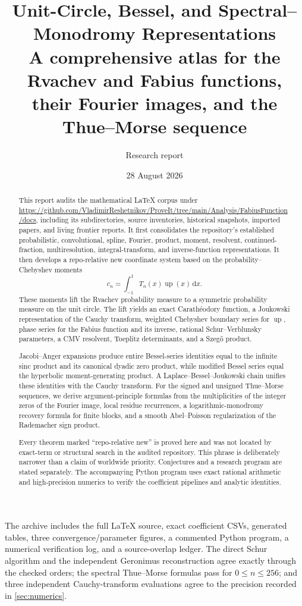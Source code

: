 \documentclass[11pt,oneside]{article}
\title{\textbf{Unit-Circle, Bessel, and Spectral--Monodromy Representations}\\[0.3em]
\large A comprehensive atlas for the Rvachev and Fabius functions, their Fourier images, and the Thue--Morse sequence}
\author{Research report}
\date{28 August 2026}
\theoremstyle{definition}
\newcommand{\Up}{\operatorname{up}}
\newcommand{\dd}{\,\mathrm d}
\begin{document}
\maketitle

\begin{abstract}
This report audits the mathematical \LaTeX{} corpus under
\url{https://github.com/VladimirReshetnikov/ProveIt/tree/main/Analysis/FabiusFunction/docs},
including its subdirectories, source inventories, historical snapshots, imported papers,
and living frontier reports. It first consolidates the repository's established
probabilistic, convolutional, spline, Fourier, product, moment, resolvent, continued-fraction,
multiresolution, integral-transform, and inverse-function representations. It then develops
a repo-relative new coordinate system based on the probability--Chebyshev moments
\[
 c_n=\int_{-1}^{1}T_n(x)\Up(x)\dd x.
\]
These moments lift the Rvachev probability measure to a symmetric probability measure on the
unit circle. The lift yields an exact Carath\'eodory function, a Joukowski representation of
the Cauchy transform, weighted Chebyshev boundary series for \(\Up\), phase series for the
Fabius function and its inverse, rational Schur--Verblunsky parameters, a CMV resolvent,
Toeplitz determinants, and a Szeg\H{o} product.

Jacobi--Anger expansions produce entire Bessel-series identities equal to the infinite sinc
product and its canonical dyadic zero product, while modified Bessel series equal the
hyperbolic moment-generating product. A Laplace--Bessel--Joukowski chain unifies these
identities with the Cauchy transform. For the signed and unsigned Thue--Morse sequences, we
derive argument-principle formulas from the multiplicities of the integer zeros of the
Fourier image, local residue recurrences, a logarithmic-monodromy recovery formula for
finite blocks, and a smooth Abel--Poisson regularization of the Rademacher sign product.

Every theorem marked ``repo-relative new'' is proved here and was not located by exact-term
or structural search in the audited repository. This phrase is deliberately narrower than
a claim of worldwide priority. Conjectures and a research program are stated separately.
The accompanying Python program uses exact rational arithmetic and high-precision numerics
to verify the coefficient pipelines and analytic identities.
\end{abstract}

\begin{statusbox}
The archive includes the full \LaTeX{} source, exact coefficient CSVs, generated tables,
three convergence/parameter figures, a commented Python program, a numerical verification
log, and a source-overlap ledger. The direct Schur algorithm and the independent Geronimus
reconstruction agree exactly through the checked orders; the spectral Thue--Morse formulas
pass for \(0\le n\le256\); and three independent Cauchy-transform evaluations agree to the
precision recorded in \cref{sec:numerics}.
\end{statusbox}
\end{document}
